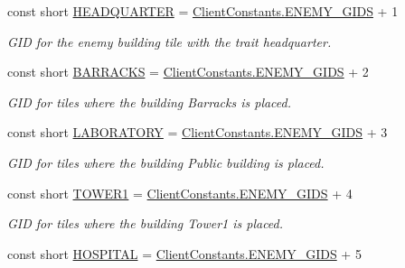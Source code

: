 \begin{DoxyCompactItemize}
\item 
const short \hyperlink{classClient_1_1Common_1_1Constants_1_1EnemyBuildingGid_a7f6e99d689514ee748d64c65d3244a10}{H\+E\+A\+D\+Q\+U\+A\+R\+T\+E\+R} = \hyperlink{classClient_1_1Common_1_1Constants_1_1ClientConstants_a0f927a203a7e65984b85f98eed560cb7}{Client\+Constants.\+E\+N\+E\+M\+Y\+\_\+\+G\+I\+D\+S} + 1
\begin{DoxyCompactList}\small\item\em G\+I\+D for the enemy building tile with the trait headquarter. \end{DoxyCompactList}\item 
const short \hyperlink{classClient_1_1Common_1_1Constants_1_1EnemyBuildingGid_a75f769cd2c58db38062452225977692f}{B\+A\+R\+R\+A\+C\+K\+S} = \hyperlink{classClient_1_1Common_1_1Constants_1_1ClientConstants_a0f927a203a7e65984b85f98eed560cb7}{Client\+Constants.\+E\+N\+E\+M\+Y\+\_\+\+G\+I\+D\+S} + 2
\begin{DoxyCompactList}\small\item\em G\+I\+D for tiles where the building Barracks is placed. \end{DoxyCompactList}\item 
const short \hyperlink{classClient_1_1Common_1_1Constants_1_1EnemyBuildingGid_a01a5884d853193f751eba336702d8b7d}{L\+A\+B\+O\+R\+A\+T\+O\+R\+Y} = \hyperlink{classClient_1_1Common_1_1Constants_1_1ClientConstants_a0f927a203a7e65984b85f98eed560cb7}{Client\+Constants.\+E\+N\+E\+M\+Y\+\_\+\+G\+I\+D\+S} + 3
\begin{DoxyCompactList}\small\item\em G\+I\+D for tiles where the building Public building is placed. \end{DoxyCompactList}\item 
const short \hyperlink{classClient_1_1Common_1_1Constants_1_1EnemyBuildingGid_a895248f7ed0edbdb9109008ad0d69bac}{T\+O\+W\+E\+R1} = \hyperlink{classClient_1_1Common_1_1Constants_1_1ClientConstants_a0f927a203a7e65984b85f98eed560cb7}{Client\+Constants.\+E\+N\+E\+M\+Y\+\_\+\+G\+I\+D\+S} + 4
\begin{DoxyCompactList}\small\item\em G\+I\+D for tiles where the building Tower1 is placed. \end{DoxyCompactList}\item 
const short \hyperlink{classClient_1_1Common_1_1Constants_1_1EnemyBuildingGid_a32b4b493906c6c811809857ba1763a5e}{H\+O\+S\+P\+I\+T\+A\+L} = \hyperlink{classClient_1_1Common_1_1Constants_1_1ClientConstants_a0f927a203a7e65984b85f98eed560cb7}{Client\+Constants.\+E\+N\+E\+M\+Y\+\_\+\+G\+I\+D\+S} + 5

\end{DoxyCompactItemize}
